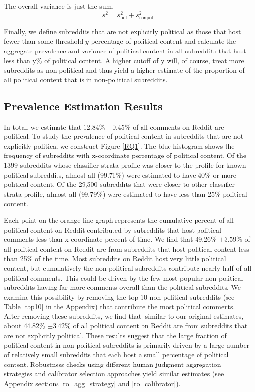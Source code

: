 \documentclass[letterpaper]{article} %
\begin{document}
The overall variance is just the sum.
\begin{displaymath}
s^2 = s^2_{\textrm{pol}} + s^2_{\textrm{nonpol}}
\end{displaymath}



Finally, we define subreddits that are not explicitly political as those that host fewer than some threshold $y$ percentage of political content and calculate the aggregate prevalence and variance of political content in all subreddits that host less than y\% of political content. A higher cutoff of y will, of course, treat more subreddits as non-political and thus yield a higher estimate of the proportion of all political content that is in non-political subreddits.

\subsection{Prevalence Estimation Results}\label{estimation_results}
In total, we estimate that 12.84\% $\pm 0.45$\%  of all comments on Reddit are political. To study the prevalence of political content in subreddits that are not explicitly political we construct Figure \ref{RQ1}. The blue histogram shows the frequency of subreddits with x-coordinate percentage of political content. Of the 1399 subreddits whose classifier strata profile was closer to the profile for known political subreddits, almost all (99.71\%) were estimated to have 40\% or more political content.
Of the 29,500 subreddits that were closer to other classifier strata profile, almost all (99.79\%) were estimated to have less than 25\% political content.

Each point on the orange line graph represents the cumulative percent of all political content on Reddit contributed by subreddits that host political comments less than x-coordinate percent of time. We find that 49.26\% $\pm 3.59$\% of all political content on Reddit are from subreddits that host political content less than 25\% of the time.
Most subreddits on Reddit host very little political content, but cumulatively the non-political subreddits contribute nearly half of all political comments. This could be driven by the few most popular non-political subreddits having far more comments overall than the political subreddits. We examine this possibility by removing the top 10 non-political subreddits (see Table \ref{top10} in the Appendix) that contribute the most political comments. After removing these subreddits, we find that, similar to our original estimates, about 44.82\% $\pm 3.42$\% of all political content on Reddit are from subreddits that are not explicitly political. These results suggest that the large fraction of political content in non-political subreddits is primarily driven by a large number of relatively small subreddits that each host a small percentage of political content. Robustness checks using different human judgment aggregation strategies and calibrator selection approaches yield similar estimates (see Appendix sections \ref{ro_agg_strategy} and \ref{ro_calibrator}).
\end{document}
